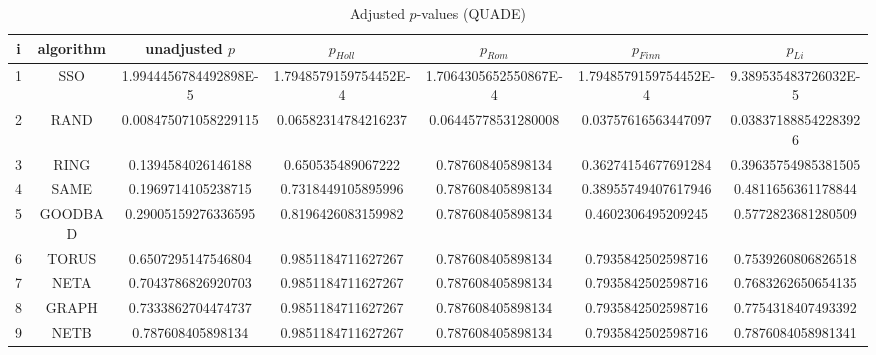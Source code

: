 \documentclass[a4paper,10pt]{article}
\begin{document}
\begin{landscape}
\begin{table}[!htp]
\centering\scriptsize
\caption{Adjusted $p$-values (QUADE)}
\begin{tabular}{ccccccc}
i&algorithm&unadjusted $p$&$p_{Holl}$&$p_{Rom}$&$p_{Finn}$&$p_{Li}$\\
\hline
1& SSO&1.9944456784492898E-5&1.7948579159754452E-4&1.7064305652550867E-4&1.7948579159754452E-4&9.389535483726032E-5\\
2& RAND&0.008475071058229115&0.06582314784216237&0.06445778531280008&0.03757616563447097&0.038371888542283926\\
3& RING&0.1394584026146188&0.650535489067222&0.787608405898134&0.36274154677691284&0.39635754985381505\\
4& SAME&0.1969714105238715&0.7318449105895996&0.787608405898134&0.38955749407617946&0.4811656361178844\\
5& GOODBAD&0.29005159276336595&0.8196426083159982&0.787608405898134&0.4602306495209245&0.5772823681280509\\
6& TORUS&0.6507295147546804&0.9851184711627267&0.787608405898134&0.7935842502598716&0.7539260806826518\\
7& NETA&0.7043786826920703&0.9851184711627267&0.787608405898134&0.7935842502598716&0.7683262650654135\\
8& GRAPH&0.7333862704474737&0.9851184711627267&0.787608405898134&0.7935842502598716&0.7754318407493392\\
9& NETB&0.787608405898134&0.9851184711627267&0.787608405898134&0.7935842502598716&0.7876084058981341\\
\hline
\end{tabular}
\end{table}

\end{landscape}
\end{document}
